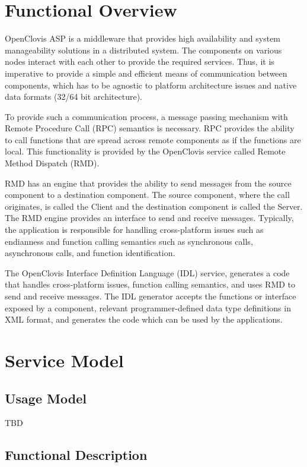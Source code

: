 
\hypertarget{group__group24}{
\chapter{Functional Overview}
\label{group__group24}
}

\begin{flushleft}
OpenClovis ASP is a middleware that provides high availability and system manageability solutions in a distributed system. The components on various 
nodes interact with each other to provide the required services. Thus, it is imperative to provide a simple and efficient means of communication between
components, which has to be agnostic to platform architecture issues and native data formats (32/64 bit architecture). 
\par
To provide such a communication process, a message passing mechanism with Remote Procedure Call (RPC) semantics is necessary. RPC provides the ability to 
call functions that are spread across remote components as if the functions are local. This functionality is provided by the OpenClovis service called 
Remote Method Dispatch (RMD).
\par
RMD has an engine that provides the ability to send messages from the source component to a destination component. The source component, where the call 
originates, is called the Client and the destination component is called the Server. The RMD engine provides an interface to send and receive messages. 
Typically, the application is responsible for handling cross-platform issues such as endianness and function calling semantics such as synchronous calls, 
asynchronous calls, and function identification. 
\par
The OpenClovis Interface Definition Language (IDL) service, generates a code that handles cross-platform issues, function calling semantics, and uses 
RMD to send and receive messages. The IDL generator accepts the functions or interface exposed by a component, relevant programmer-defined data type 
definitions in XML format, and generates the code which can be used by the applications.

\chapter{Service Model}
\section{Usage Model}
TBD
\section{Functional Description}


\end{flushleft}
